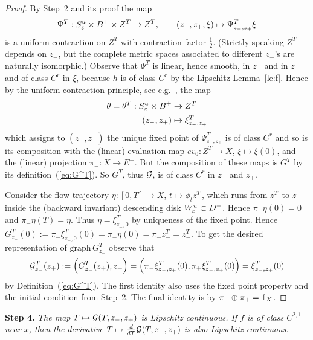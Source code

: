 \documentclass{article}
\begin{document}
\begin{proof}
By Step~2 and its proof the map
$$
     \Psi^T:
     S^u_{\varepsilon}\times B^+\times Z^T\to Z^T,\qquad
     ({z_-},z_+,\xi)\mapsto\Psi^T_{{z_-},z_+}\xi
$$
is a uniform contraction on $Z^T$ with contraction factor $\tfrac12$. (Strictly speaking $Z^T$ depends on
${z_-}$, but the complete metric spaces associated to different ${z_-}$'s are naturally
isomorphic.) Observe that $\Psi^T$ is linear, hence smooth, in ${z_-}$ and in
$z_+$ and of class $C^r$ in $\xi$, because $h$ is of class $C^r$ by the Lipschitz Lemma~\ref{le:f}.
Hence by the uniform contraction principle, see e.g.~\cite[\S 2.2]{chow:1982a}, the map 
\begin{equation}\label{eq:unif-contraction-theta}
\begin{split}
     \theta=\theta^T:S^u_\eps\times B^+
   &\to Z^T
   \\
     ({z_-},z_+)
   &\mapsto
     \xi^T_{{z_-},z_+}
\end{split}
\end{equation}
which assigns to $({z_-},z_+)$  the unique fixed point of $\Psi^T_{{z_-},z_+}$ is of class
$C^r$ and so is its composition with the (linear) evaluation map $ev_0:Z^T\to X$, $\xi\mapsto\xi(0)$,
and the (linear) projection $\pi_-:X\to E^-$. But the composition of these maps is $G^T$ by
its definition~(\ref{eq:G^T}). So $G^T$, thus ${\mathcal{G}}$, is of class $C^r$ in ${z_-}$ and $z_+$.

Consider the flow trajectory $\eta:[0,T]\to X$, $t\mapsto\phi_t{z_-^T}$,
which runs from ${z_-^T}$ to ${z_-}$ inside the (backward invariant) descending
disk $W^u_{\varepsilon}\subset D^-$. Hence $\pi_+\eta(0)=0$ and $\pi_-\eta(T)=\eta$.
Thus $\eta=\xi^T_{{z_-},0}$ by uniqueness of the fixed point. Hence
$
     G^T_{z_-}(0)
     :=\pi_-\xi^T_{{z_-},0}(0)
     =\pi_-\eta(0)
     =\pi_-{z_-^T}
     ={z_-^T}
$.
To get the desired representation of $\mathrm{graph}\, G^T_{z_-}$ observe that
\begin{equation}\label{eq:G=xi}
     \Gg^T_{z_-}(z_+)
     :=\left( G^T_{z_-}(z_+),z_+\right)
     =\left(\pi_-\xi^T_{{z_-},z_+}(0),
     \pi_+ \xi^T_{{z_-},z_+}(0)\right)
     =\xi^T_{{z_-},z_+}(0)
\end{equation}
by Definition~(\ref{eq:G^T}). The first identity also uses the fixed point
property and the initial condition from Step~2. The final identity is by $\pi_-\oplus\pi_+=\1_X$.
\end{proof}


\noindent
{\bf Step 4.}
{\it The map $T\mapsto{\mathcal{G}}(T,{z_-},z_+)$ is Lipschitz continuous.
If $f$ is of class $C^{2,1}$ near $x$, then the derivative
$T\mapsto\frac{d}{dT}{\mathcal{G}}(T,{z_-},z_+)$ is also Lipschitz continuous.
} 
\end{document}
